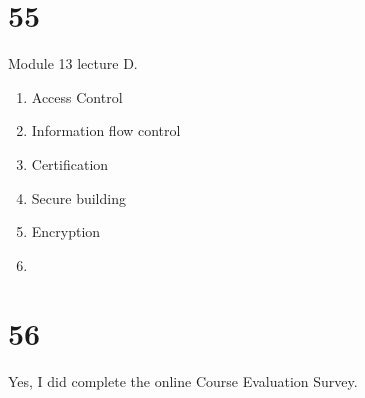 \documentclass[a4paper,11pt]{article}
\begin{document}

\section*{55}
Module 13 lecture D.
\begin{enumerate}
  \item  Access Control
  \item  Information flow control
  \item  Certification
  \item  Secure building
  \item  Encryption
  \item
\end{enumerate}



\section*{56}
Yes, I did complete the online Course Evaluation Survey.

\end{document}
